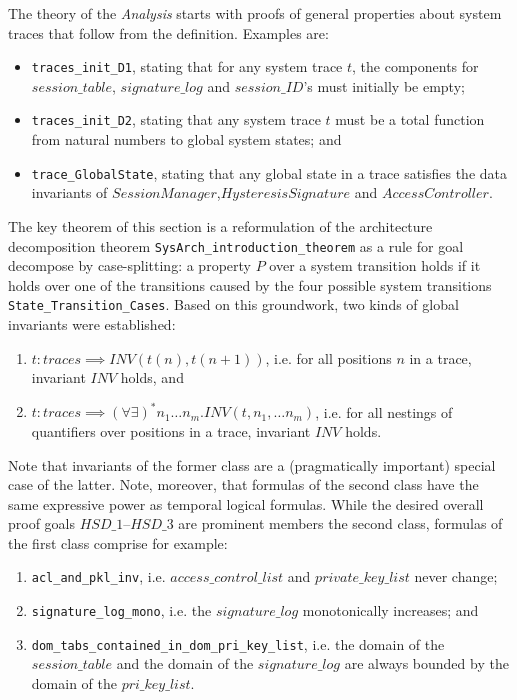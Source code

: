 \documentclass[a4paper,pdftex]{article}
\def\inlinesml{\lstinline[style=sml]}
\begin{document}
The theory of the \emph{Analysis} starts with proofs of general
properties about system traces that follow from the definition. 
Examples are:
\begin{itemize}
\item \inlinesml+traces_init_D1+, stating that for any system trace $t$,  the components
for $session\_table$, $signature\_log$ and $session\_ID$'s must initially be
empty;
\item \inlinesml+traces_init_D2+, stating that any system trace $t$ must be a total function from
natural numbers to global system states; and
\item \inlinesml+trace_GlobalState+, stating that any global state in a trace satisfies the  data invariants of $SessionManager$,$HysteresisSignature$ and
$AccessController$.
\end{itemize}
The key theorem of this section is a
reformulation of the architecture decomposition theorem
\inlinesml{SysArch_introduction_theorem} as a rule for goal decompose
by case-splitting: a property $P$ over a system transition holds if it
holds over one of the transitions caused by the four possible system
transitions
\inlinesml+State_Transition_Cases+. Based on this groundwork, two kinds of
global invariants were established:
\begin{enumerate}
\item $t : traces \implies INV(t(n), t(n+1))$, i.e. for all positions $n$ in 
      a trace, invariant $INV$ holds, and
\item $t : traces \implies (\forall\exists)^{*}n_1\ldots n_m. INV(t, n_1,\ldots n_m)$, i.e. for all nestings of quantifiers over positions in a trace,
     invariant $INV$ holds.
\end{enumerate}
Note that invariants of the former class are a (pragmatically
important) special case of the latter. Note, moreover, that
formulas of the second class have the same expressive power as temporal logical formulas.
While the desired overall proof goals $HSD\_1$--$HSD\_3$ are prominent
members the second class, formulas of the first class comprise for example:
\begin{enumerate}
\item \inlinesml+acl_and_pkl_inv+, i.e. $access\_control\_list$ and $private\_key\_list$
never change;
\item \inlinesml+signature_log_mono+, i.e. the $signature\_log$ monotonically increases; and
\item \inlinesml+dom_tabs_contained_in_dom_pri_key_list+, i.e. the domain of the 
      $session\_table$ and the domain of the $signature\_log$ are
      always bounded by the domain of the $pri\_key\_list$.
\end{enumerate}
\end{document}
